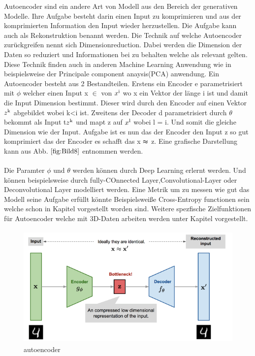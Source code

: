 \documentclass{llncs}
\begin{document}
Autoencoder sind ein andere Art von Modell aus den Bereich der generativen Modelle. Ihre Aufgabe besteht darin einen Input zu komprimieren und aus der komprimierten Information den Input wieder herzustellen. Die Aufgabe kann auch als Rekonstruktion benannt werden. Die Technik auf welche Autoencoder zurückgreifen nennt sich Dimensionreduction. Dabei werden die Dimension der Daten so reduziert und Informationen bei zu behalten welche als relevant gelten. Diese Technik finden auch in anderen Machine Learning Anwendung wie in beispielsweise der Principale component anaysis(PCA) anwendung.  Ein Autoencoder besteht aus 2 Bestandteilen. Erstens ein Encoder e parametrisiert mit $\phi$ welcher einen Input x $\in$ von $x\textsuperscript{i}$ wo x ein Vektor der länge i ist und damit die Input Dimension bestimmt. Dieser wird durch den Encoder auf einen Vektor $z\textsuperscript{k}$ abgebildet wobei k<i ist.  Zweitens der Decoder d parametrisiert durch  $\theta$ bekommt als Input t$z\textsuperscript{k}$ und mapt z auf $x\textsuperscript{l}$ wobei l = i. Und somit die gleiche Dimension wie der Input. Aufgabe ist es nun das der Encoder den Input z so gut komprimiert das der  Encoder es schafft das x $\thickapprox$ z. Eine grafische Darstellung kann aus Abb. $\ref{fig:Bild8}$ entnommen werden. 
\\\\
Die Paramter $\phi$ und $\theta$ werden können durch Deep Learning erlernt werden. Und können beispielsweise durch fully-COnnected Layer,Convolutional-Layer oder Deconvolutional Layer modelliert werden. Eine Metrik um zu messen wie gut das Modell seine Aufgabe erfüllt könnte Beispielsweiße Cross-Entropy functionen sein welche schon in Kapitel vorgestellt worden sind. Weitere spezfische Zielfunktionen für Autoencoder welche mit 3D-Daten arbeiten werden unter Kapitel vorgestellt.

\begin{figure}[htbp] 
	\centering
	\includegraphics[width=1.0\textwidth]{autoencoder.png}
	\caption{autoencoder}
	\label{fig:Bild8}
\end{figure}
\end{document}
